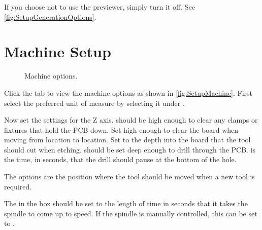 \documentclass[11pt]{book}
\begin{document}
If you choose not to use the previewer, simply turn it off. See \figurename \vref{fig:SetupGenerationOptions}.



%
%
\section{Machine Setup}\label{sec:MachineSetup}

\begin{figure}
	\caption{Machine options.}
	\label{fig:SetupMachine}
\end{figure}

Click the  tab to view the machine options as shown in \figurename \vref{fig:SetupMachine}. First select the preferred unit of measure by selecting it under . 

Now set the settings for the Z axis.  should be high enough to clear any clamps or fixtures that hold the PCB down. Set  high enough to clear the board when moving from location to location. Set  to the depth into the board that the tool should cut when etching.  should be set deep enough to drill through the PCB.  is the time, in seconds, that the drill should pause at the bottom of the hole.

The  options are the position where the tool should be moved when a new tool is required.

The  in the  box should be set to the length of time in seconds that it takes the spindle to come up to speed. If the spindle is manually controlled, this can be set to .
\end{document}
